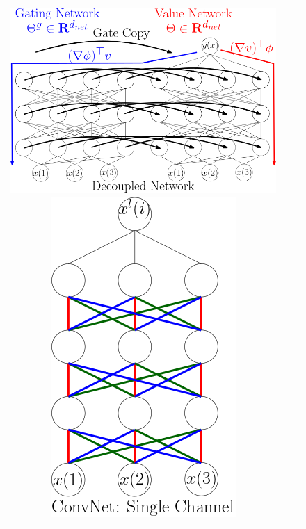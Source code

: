 \begin{figure}
{\begin{tabular}{ccc}
\includegraphics[scale=0.5]{figs/nntwin.png}
\includegraphics[scale=0.5]{figs/nnconv.png}
\end{tabular}
}

\end{figure}
